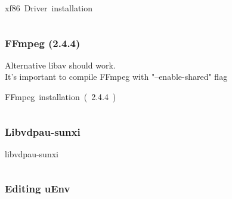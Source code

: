 \documentclass[11pt, a4paper,ngerman]{article}
\begin{document}
\begin{mintedbox}[breakable=true,
 bottomrule=0.5mm,
 width=\paperwidth-3cm,
 boxsep=1mm, 
 enhanced=true,
 colframe = monoblack,
 drop fuzzy shadow,
 colback = black
 ]{xf86\ Driver\ installation}%
 

     \inputminted[firstline=3,lastline=10, 
     linenos=true, framesep=2mm, mathescape, numbersep=5pt,tabsize=4,%
]{bash}{includes/software.sh}%

\end{mintedbox}%

\subsubsection{FFmpeg (2.4.4)}

Alternative libav should work. \\

It's important to compile FFmpeg with "--enable-shared" flag \\

\begin{mintedbox}[breakable=true,
 bottomrule=0.5mm,
 width=\paperwidth-3cm,
 boxsep=1mm, 
 enhanced=true,
 colframe = monoblack,
 drop fuzzy shadow,
 colback = black
 ]{FFmpeg\ installation\ (\ 2.4.4\ )}%
 

     \inputminted[firstline=14,lastline=20, 
     linenos=true, framesep=2mm, mathescape, numbersep=5pt,tabsize=4,%
]{bash}{includes/software.sh}%

\end{mintedbox}%

\subsubsection{Libvdpau-sunxi}

\begin{mintedbox}[breakable=true,
 bottomrule=0.5mm,
 width=\paperwidth-3cm,
 boxsep=1mm, 
 enhanced=true,
 colframe = monoblack,
 drop fuzzy shadow,
 colback = black
 ]{libvdpau-sunxi}%
 

     \inputminted[firstline=24,lastline=28, 
     linenos=true, framesep=2mm, mathescape, numbersep=5pt,tabsize=4,%
]{bash}{includes/software.sh}%

\end{mintedbox}%

\subsubsection{Editing uEnv}
\end{document}
